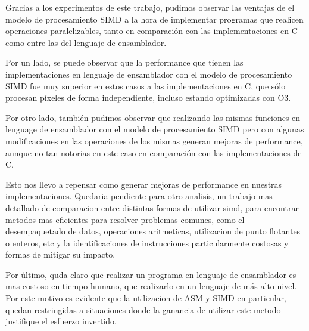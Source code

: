 Gracias a los experimentos de este trabajo, pudimos observar las ventajas de el modelo de procesamiento SIMD a la hora de implementar programas que realicen operaciones paralelizables, tanto en comparación con las implementaciones en C como entre las del lenguaje de ensamblador.

Por un lado, se puede observar que la performance que tienen las implementaciones en lenguaje de ensamblador con el modelo de procesamiento SIMD fue muy superior en estos casos a las implementaciones en C, que sólo procesan píxeles de forma independiente, incluso estando optimizadas con O3. 

Por otro lado, también pudimos observar que realizando las mismas funciones en lenguage de ensamblador con el modelo de procesamiento SIMD pero con algunas modificaciones en las operaciones de los mismas generan mejoras de performance, aunque no tan notorias en este caso en comparación con las implementaciones de C. 

Esto nos llevo a repensar como generar mejoras de performance en nuestras implementaciones. 
Quedaria pendiente para otro analisis, un trabajo mas detallado de comparacion entre distintas formas de utilizar simd, para encontrar metodos mas eficientes para resolver problemas comunes, como el desempaquetado de datos, operaciones aritmeticas, utilizacion de punto flotantes o enteros, etc y la identificaciones de instrucciones particularmente costosas y formas de mitigar su impacto.

Por último, quda claro que realizar un programa en lenguaje de ensamblador es mas costoso en tiempo humano, que realizarlo en un lenguaje de más alto nivel. Por este motivo es evidente que la utilizacion de ASM y SIMD en particular, quedan restringidas a situaciones donde la ganancia de utilizar este metodo justifique el esfuerzo invertido.
